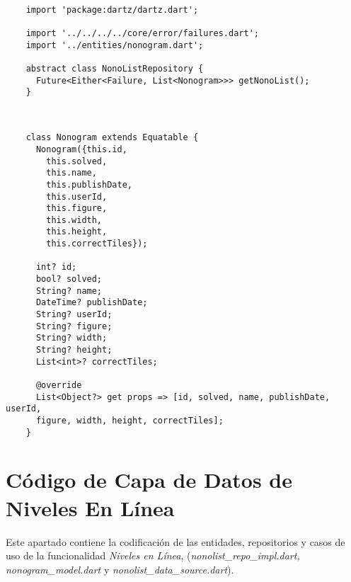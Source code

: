     \begin{lstlisting}
    
    import 'package:dartz/dartz.dart';

    import '../../../../core/error/failures.dart';
    import '../entities/nonogram.dart';
    
    abstract class NonoListRepository {
      Future<Either<Failure, List<Nonogram>>> getNonoList();
    }
      
    \end{lstlisting}

    \pagebreak

    \begin{lstlisting}

    class Nonogram extends Equatable {
      Nonogram({this.id,
        this.solved,
        this.name,
        this.publishDate,
        this.userId,
        this.figure, 
        this.width, 
        this.height, 
        this.correctTiles});

      int? id;
      bool? solved;
      String? name;
      DateTime? publishDate;
      String? userId;
      String? figure;
      String? width;
      String? height;
      List<int>? correctTiles;

      @override
      List<Object?> get props => [id, solved, name, publishDate, userId,
      figure, width, height, correctTiles];
    }
    \end{lstlisting}

    \section{Código de Capa de Datos de Niveles En Línea}

    \label{cap:anexo1-4}
    
    Este apartado contiene la codificación de las entidades, repositorios y casos de uso de la 
    funcionalidad \textit{Niveles en Línea}, (\textit{nonolist\_repo\_impl.dart, nonogram\_model.dart}
    \linebreak y \textit{nonolist\_data\_source.dart}).
    
